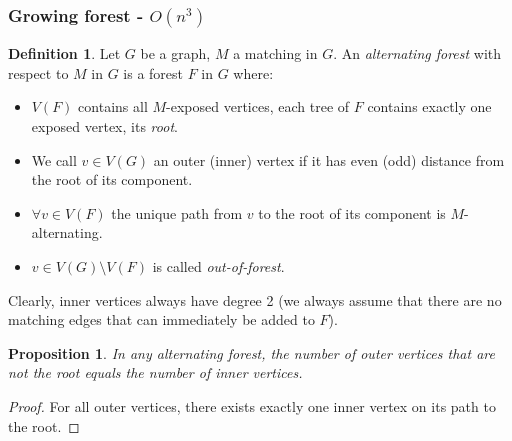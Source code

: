 \documentclass[11pt, a4paper]{article}
\newtheorem{prop}[theorem]{Proposition}
\theoremstyle{remark}
\theoremstyle{definition}
\newtheorem{definition}[theorem]{Definition}
\begin{document}
\subsubsection{Growing forest\texorpdfstring{ - $O(n^3)$}{}}
\begin{definition}
Let $G$ be a graph, $M$ a matching in $G$. An \emph{alternating forest}
with respect to $M$ in $G$ is a forest $F$ in $G$ where:
\begin{itemize}
	\item $V(F)$ contains all $M$-exposed vertices, each tree of $F$
	contains exactly one exposed vertex, its \emph{root}.
	\item We call $v\in V(G)$ an outer (inner) vertex if it has even
	(odd) distance from the root of its component.
	\item $\forall v\in V(F)$ the unique path from $v$ to the root of
	its component is $M$-alternating.
	\item $v\in V(G)\setminus V(F)$ is called \emph{out-of-forest}.
\end{itemize}
Clearly, inner vertices always have degree 2 (we always assume that there
are no matching edges that can immediately be added to $F$).
\end{definition}

\begin{prop}
In any alternating forest, the number of outer vertices that are not the
root equals the number of inner vertices.
\end{prop}
\begin{proof}
For all outer vertices, there exists exactly one inner vertex on its path
to the root.
\end{proof}
\end{document}
